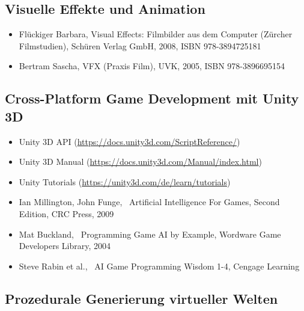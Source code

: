 \subsection*{Visuelle Effekte und
Animation\label{/mi-2017/modulbeschreibungen-bachelor/BA_Vertiefung-Visual-Computing}}\label{visuelle-effekte-und-animationpathlabelmi-2017modulbeschreibungen-bachelorbaux5fvertiefung-visual-computing-4}

\begin{itemize}
\tightlist
\item
  Flückiger Barbara, Visual Effects: Filmbilder aus dem Computer
  (Zürcher Filmstudien), Schüren Verlag GmbH, 2008, ISBN 978-3894725181
\item
  Bertram Sascha, VFX (Praxis Film), UVK, 2005, ISBN 978-3896695154
\end{itemize}

\subsection*{Cross-Platform Game Development mit Unity
3D\label{/mi-2017/modulbeschreibungen-bachelor/BA_Vertiefung-Visual-Computing}}\label{cross-platform-game-development-mit-unity-3dpathlabelmi-2017modulbeschreibungen-bachelorbaux5fvertiefung-visual-computing-3}

\begin{itemize}
\tightlist
\item
  Unity 3D API (\url{https://docs.unity3d.com/ScriptReference/})
\item
  Unity 3D Manual (\url{https://docs.unity3d.com/Manual/index.html})
\item
  Unity Tutorials (\url{https://unity3d.com/de/learn/tutorials})
\item
  Ian Millington, John Funge,~ Artificial Intelligence For Games, Second
  Edition, CRC Press, 2009
\item
  Mat Buckland,~ Programming Game AI by Example, Wordware Game
  Developers Library, 2004
\item
  Steve Rabin et al.,~ AI Game Programming Wisdom 1-4, Cengage Learning
\end{itemize}

\subsection*{Prozedurale Generierung virtueller
Welten\label{/mi-2017/modulbeschreibungen-bachelor/BA_Vertiefung-Visual-Computing}}\label{prozedurale-generierung-virtueller-weltenpathlabelmi-2017modulbeschreibungen-bachelorbaux5fvertiefung-visual-computing-4}

